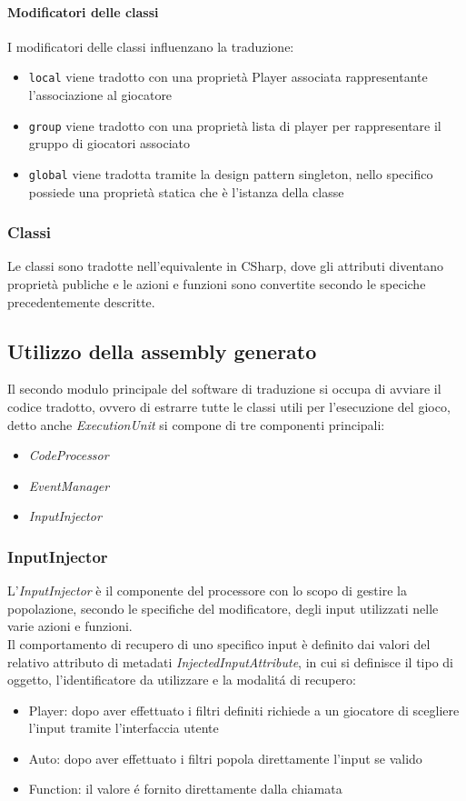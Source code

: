 \paragraph*{Modificatori delle classi} I modificatori delle classi influenzano la traduzione:
\begin{itemize}
    \item \lstinline|local| viene tradotto con una proprietà Player associata rappresentante l'associazione al giocatore
    \item \lstinline|group| viene tradotto con una proprietà lista di player per rappresentare il gruppo di giocatori associato
    \item \lstinline|global| viene tradotta tramite la design pattern singleton, nello specifico possiede una proprietà statica che è l'istanza della classe
\end{itemize}

\subsubsection{Classi}
Le classi sono tradotte nell'equivalente in CSharp, dove gli attributi diventano 
proprietà publiche e le azioni e funzioni sono convertite secondo le speciche precedentemente
descritte.

\subsection{Utilizzo della assembly generato}
Il secondo modulo principale del software di traduzione si occupa di avviare 
il codice tradotto, ovvero di estrarre tutte le classi utili per l'esecuzione 
del gioco, detto anche \textit{ExecutionUnit} si compone di tre componenti principali:
\begin{itemize}
    \item \textit{CodeProcessor}
    \item \textit{EventManager}
    \item \textit{InputInjector}
\end{itemize}

\subsubsection{InputInjector}
L'\textit{InputInjector} è il componente del processore con lo scopo di gestire la popolazione, secondo le specifiche del modificatore,
degli input utilizzati nelle varie azioni e funzioni. \\ 
Il comportamento di recupero di uno specifico input è definito dai valori del relativo attributo di metadati \textit{InjectedInputAttribute},
in cui si definisce il tipo di oggetto, l'identificatore da utilizzare e la modalitá di recupero:
\begin{itemize}
    \item Player: dopo aver effettuato i filtri definiti richiede a un giocatore di scegliere l'input tramite l'interfaccia utente
    \item Auto: dopo aver effettuato i filtri popola direttamente l'input se valido
    \item Function: il valore é fornito direttamente dalla chiamata  
\end{itemize}


